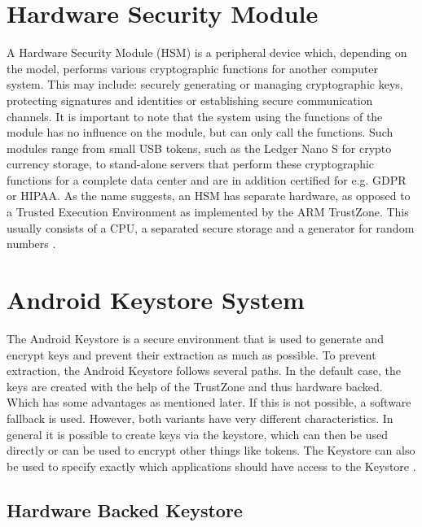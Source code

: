 \documentclass[12pt,oneside,a4paper,parskip]{scrbook}
\begin{document}
\section{Hardware Security Module}
\label{sec:HSM}

A Hardware Security Module (HSM) is a peripheral device which, depending on the model, performs various cryptographic functions for another computer system. This may include: securely generating or managing cryptographic keys, protecting signatures and identities or establishing secure communication channels. It is important to note that the system using the functions of the module has no influence on the module, but can only call the functions. Such modules range from small USB tokens, such as the Ledger Nano S for crypto currency storage, to stand-alone servers that perform these cryptographic functions for a complete data center and are in addition certified for e.g. GDPR or HIPAA. As the name suggests, an HSM has separate hardware, as opposed to a Trusted Execution Environment as implemented by the ARM TrustZone. This usually consists of a CPU, a separated secure storage and a generator for random numbers \parencite{sustek_hardware_2011}.

\section{Android Keystore System}
The Android Keystore is a secure environment that is used to generate and encrypt keys and prevent their extraction as much as possible. To prevent extraction, the Android Keystore follows several paths. 
In the default case, the keys are created with the help of the TrustZone and thus hardware backed. Which has some advantages as mentioned later. If this is not possible, a software fallback is used. However, both variants have very different characteristics. In general it is possible to create keys via the keystore, which can then be used directly or can be used to encrypt other things like tokens.
The Keystore can also be used to specify exactly which applications should have access to the Keystore \parencite{google_android_2020}.

\subsection{Hardware Backed Keystore}
\label{android:HWB}
\end{document}
